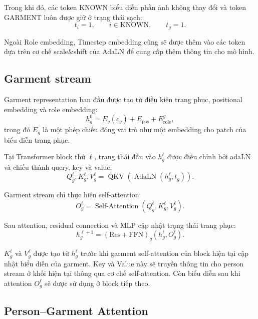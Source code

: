\documentclass[11pt,a4paper]{article}
\begin{document}
Trong khi đó, các token KNOWN biểu diễn phần ảnh không thay đổi và token GARMENT luôn được giữ ở trạng thái sạch:
\begin{equation}
t_i=1,\qquad i\in\mathrm{KNOWN},\qquad t_g=1.
\end{equation}

Ngoài Role embedding, Timestep embedding cũng sẽ được thêm vào các token dựa trên cơ chế scale\&shift của AdaLN để cung cấp thêm thông tin cho mô hình.

\subsection{Garment stream}

Garment representation ban đầu được tạo từ điều kiện trang phục, positional embedding và role embedding:
\begin{equation}
h_g^0=E_g(c_g)+E_{\mathrm{pos}}+E_{\mathrm{role}}^{g},
\end{equation}
trong đó \(E_g\) là một phép chiếu đóng vai trò như một embedding cho patch của biểu diễn trang phục.

Tại Transformer block thứ \(\ell\), trạng thái đầu vào \(h_g^\ell\) được điều chỉnh bởi adaLN và chiếu thành query, key và value:
\begin{equation}
Q_g^\ell,K_g^\ell,V_g^\ell=\operatorname{QKV}\left(\operatorname{AdaLN}(h_g^\ell,t_g)\right). \label{eq:garment_qkv}
\end{equation}

Garment stream chỉ thực hiện self-attention:
\begin{equation}
O_g^\ell=\operatorname{Self-Attention}\left(Q_g^\ell,K_g^\ell,V_g^\ell\right).
\end{equation}

Sau attention, residual connection và MLP cập nhật trạng thái trang phục:
\begin{equation}
h_g^{\ell+1}=\operatorname{(Res+FFN)}_g(h_g^\ell,O_g^\ell).
\end{equation}

\(K_g^\ell\) và \(V_g^\ell\) được tạo từ \(h_g^\ell\) trước khi garment self-attention của block hiện tại cập nhật biểu diễn của garment. Key và Value này sẽ truyền thông tin cho person stream ở khối hiện tại thông qua cơ chế self-attention. Còn biểu diễn sau khi attention \(O_g^\ell\) sẽ được sử dụng ở block tiếp theo.

\subsection{Person--Garment Attention}
\end{document}
